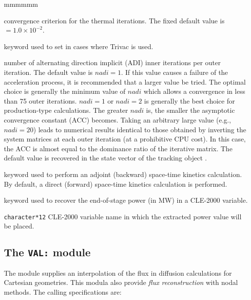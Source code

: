 \begin{ListeDeDescription}{mmmmmm}
\item[\dusa{epsthr}] convergence criterion for the thermal iterations. The
fixed default value is  $=1.0\times 10^{-2}$.

\item[\moc{ADI}] keyword used to set  in cases where Trivac is used.

\item[\dusa{nadi}] number of alternating direction implicit  (ADI) inner
iterations per outer iteration. The default value is $nadi=1$. If this value causes a failure of the acceleration process, it is recommended that a larger value be tried. The optimal
choice is generally the minimum value of $nadi$ which allows a convergence in
less than 75 outer iterations. $nadi=1$ or $nadi=2$ is generally the best
choice for production-type calculations. The greater $nadi$ is, the smaller 
the asymptotic convergence constant (ACC) becomes. Taking an arbitrary large
value (e.g., $nadi=20$) leads to numerical results identical to those obtained by
inverting the system matrices at each
outer iteration (at a prohibitive CPU cost). In this case, the ACC is almost
equal to the dominance ratio of the iterative matrix. The default value is
recovered in the state vector of the {\sc tracking} object .

\item[\moc{ADJ}] keyword used to perform an adjoint (backward) space-time kinetics calculation. By default, a direct (forward) space-time kinetics calculation
is performed.

\item[\moc{PICK}]  keyword used to recover the end-of-stage power (in MW) in a CLE-2000 variable.

\item[\dusa{power\_out}] \texttt{character*12} CLE-2000 variable name in which the extracted power value will be placed.

\end{ListeDeDescription}
\clearpage


\subsection{The {\tt VAL:} module}\label{sect:VALData}

The  module supplies an interpolation of the flux in diffusion calculations for
Cartesian geometries. This modula also provide {\sl flux reconstruction} with nodal methods. The calling specifications are:

